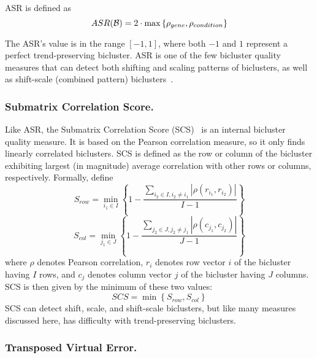 \noindent ASR is defined as
\begin{equation} \label{asr}
	ASR(\mathcal{B}) = 2 \cdot \max\left\{\rho_{\normalfont{gene}}, \rho_{\normalfont{condition}}\right\}
\end{equation}

\noindent The ASR's value is in the range $\left[-1, 1\right]$, where both $-1$ and $1$ represent a perfect trend-preserving bicluster. ASR is one of the few bicluster quality measures that can detect both shifting and scaling patterns of biclusters, as well as shift-scale (combined pattern) biclusters~\cite{pontes2015quality}.
\\

\subsubsection{ Submatrix Correlation Score.}
\label{sec:scs}

Like ASR, the Submatrix Correlation Score (SCS)~\cite{yang2011finding} is an internal bicluster quality measure.
It is based on the Pearson correlation measure, so it only finds linearly correlated biclusters.
SCS is defined as the row or column of the bicluster exhibiting largest (in magnitude) average correlation with other rows or columns, respectively.
Formally, define
\begin{equation}
	S_{row} = \min_{i_1 \in I} \left\{ 1 - \frac{\sum_{i_2 \in I, i_2 \ne i_1} |\rho(r_{i_1}, r_{i_2})|}{I-1} \right\}
\end{equation}
\begin{equation}
	S_{col} = \min_{j_1 \in J} \left\{ 1 - \frac{\sum_{j_2 \in J, j_2 \ne j_1} |\rho(c_{j_1}, c_{j_2})|}{J-1} \right\}
\end{equation}
where $\rho$ denotes Pearson correlation, $r_i$ denotes row vector $i$ of the bicluster having $I$ rows, and $c_j$ denotes column vector $j$ of the bicluster having $J$ columns.
SCS is then given by the minimum of these two values:
\begin{equation}
	SCS = \min\left\{S_{row}, S_{col}\right\}
\end{equation}
SCS can detect shift, scale, and shift-scale biclusters, but like many measures discussed here, has difficulty with trend-preserving biclusters.
\\

\subsubsection{ Transposed Virtual Error.}
\label{sec:vet}

